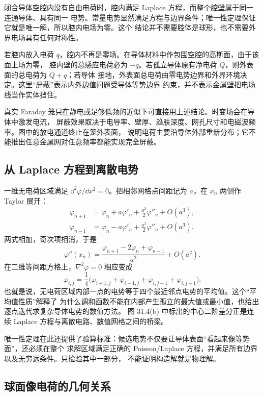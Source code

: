 闭合导体空腔内没有自由电荷时，腔内满足 Laplace 方程，而整个腔壁属于同一连通导体、具有同一
电势。常量电势显然满足方程与边界条件；唯一性定理保证它就是唯一解，所以腔内电场为零。这个
结论并不需要腔体是球形，也不需要外界电场具有任何对称性。

若腔内放入电荷 $q$，腔内不再是零场。在导体材料中作包围空腔的高斯面，由于该面上场为零，
腔内壁的总感应电荷必为 $-q$。若孤立导体原有净电荷 $Q$，则外表面的总电荷为 $Q+q$；若导体
接地，外表面总电荷由零电势边界和外界环境决定。这里“屏蔽”表示内外边值问题受导体等势边界
约束，并不表示金属壁把电场线当作实体挡住。

真实 Faraday 笼只在静电或足够低频的近似下可直接用上述结论。时变场会在导体中激发电流，
屏蔽效果取决于电导率、壁厚、趋肤深度、网孔尺寸和电磁波频率。图中的放电通道终止在笼外表面，
说明电荷主要沿导体外部重新分布；它不能推出任意金属网对任意频率都能实现完全屏蔽。

\subsection*{从 Laplace 方程到离散电势}

一维无电荷区域满足 $\dd^2\varphi/\dd x^2=0$。把相邻网格点间距记为 $a$，在 $x_n$ 两侧作
Taylor 展开：
\begin{align*}
 \varphi_{n+1}&=\varphi_n+a\varphi'_n+\frac{a^2}{2}\varphi''_n+O(a^3),\\
 \varphi_{n-1}&=\varphi_n-a\varphi'_n+\frac{a^2}{2}\varphi''_n+O(a^3).
\end{align*}
两式相加，奇次项相消，于是
\begin{equation}
 \varphi''(x_n)=\frac{\varphi_{n+1}-2\varphi_n+\varphi_{n-1}}{a^2}+O(a^2).
\end{equation}
在二维等间距方格上，$\nabla^2\varphi=0$ 相应变成
\begin{equation}
 \boxed{\varphi_{i,j}=\frac14\bigl(\varphi_{i+1,j}+\varphi_{i-1,j}
 +\varphi_{i,j+1}+\varphi_{i,j-1}\bigr)}.
\end{equation}
也就是说，无电荷区域内部一点的电势等于四个最近邻点电势的平均值。这个“平均值性质”解释了
为什么调和函数不能在内部产生孤立的最大值或最小值，也给出逐点迭代求复杂导体电势的数值方法。
图 31.4(b) 中标出的中心二阶差分正是连续 Laplace 方程与离散电路、数值网格之间的桥梁。

唯一性定理在此还提供了验算标准：候选电势不仅要让导体表面“看起来像等势面”，还必须在整个
求解区域满足正确的 Poisson/Laplace 方程，并满足所有边界以及无穷远条件。只检验其中一部分，
不能证明构造解就是物理解。

\subsection*{球面像电荷的几何关系}

